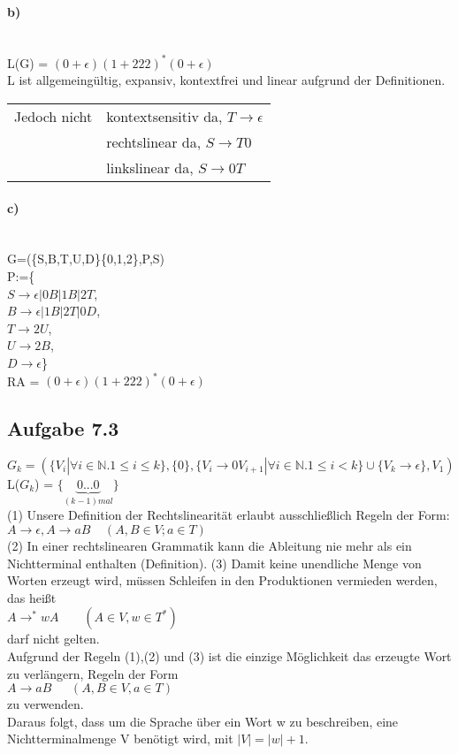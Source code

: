 \documentclass[11pt,a4paper]{article}
\begin{document}
\paragraph*{b)}\ \\
L(G) = $(0+\epsilon)(1+222)^*(0+\epsilon)$\\
L ist allgemeingültig, expansiv, kontextfrei und linear aufgrund der Definitionen.\\
\begin{tabular}{ll}
Jedoch nicht
&kontextsensitiv da, $T \rightarrow \epsilon$\\
&rechtslinear da, $S \rightarrow T0$\\
&linkslinear da, $S \rightarrow 0T$\\
\end{tabular}
\paragraph*{c)}\ \\
G=(\{S,B,T,U,D\}\{0,1,2\},P,S)\\
P:=\{\\
\begingroup
\leftskip=21mm
\noindent
$S \rightarrow \epsilon|0B|1B|2T$,\\
$B \rightarrow \epsilon|1B|2T|0D$,\\
$T \rightarrow 2U$,\\
$U \rightarrow 2B$,\\
$D \rightarrow \epsilon$\}\\
\endgroup
RA = $(0+ \epsilon)(1+222)^*(0+ \epsilon )$
\subsection*{Aufgabe 7.3}
$G_k = (\{V_i| \forall i\in \mathbb{N}.1 \leq i \leq k \} , \{0\}, \{V_i \rightarrow 0V_{i+1}|\forall i\in \mathbb{N}.1\leq i < k\} \cup \{V_k \rightarrow \epsilon\}, V_1)$\\
L($G_k$) = $\{\underset{(k-1)mal}{\underbrace{0...0}}\}$\\
(1) Unsere Definition der Rechtslinearität erlaubt ausschließlich Regeln der Form:\\
$A \rightarrow \epsilon, A \rightarrow aB ~~~~~ (A,B \in V;a \in T)$\\
(2) In einer rechtslinearen Grammatik kann die Ableitung nie mehr als ein Nichtterminal enthalten (Definition).
(3) Damit keine unendliche Menge von Worten erzeugt wird, müssen Schleifen in den Produktionen vermieden werden, das heißt\\
$A \rightarrow^* wA~~~~~~~~~(A \in V, w \in T^*)$\\
darf nicht gelten.\\
Aufgrund der Regeln (1),(2) und (3) ist die einzige Möglichkeit das erzeugte Wort zu verlängern, Regeln der Form\\ 
$A \rightarrow aB~~~~~~~(A,B \in V, a \in T)$\\
zu verwenden.\\
Daraus folgt, dass um die Sprache über ein Wort w zu beschreiben, eine Nichtterminalmenge V benötigt wird, mit $|V| = |w| + 1$.
\end{document}
